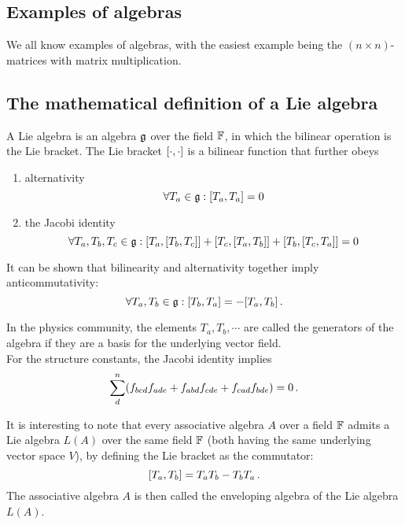    \subsection{Examples of algebras}
        We all know examples of algebras, with the easiest example being the $(n \times n)$-matrices with matrix multiplication. \\

    \subsection{The mathematical definition of a Lie algebra}
        A Lie algebra is an algebra $\operatorname{\mathfrak{g}}$ over the field $\mathbb{F}$, in which the bilinear operation is the Lie bracket. The Lie bracket $\comm{\cdot}{\cdot}$ is a bilinear function that further obeys
        \begin{enumerate}
            \item alternativity
            \begin{equation}
                \forall T_a \in \glie: \comm{T_a}{T_a} = 0
            \end{equation}

            \item the Jacobi identity
            \begin{equation}
                \forall T_a, T_b, T_c \in \glie: \comm{T_a}{\comm{T_b}{T_c}} + \comm{T_c}{\comm{T_a}{T_b}} + \comm{T_b}{\comm{T_c}{T_a}} = 0
            \end{equation}
        \end{enumerate}

        It can be shown that bilinearity and alternativity together imply anticommutativity:
        \begin{equation}
            \forall T_a, T_b \in \glie: \comm{T_b}{T_a} = - \comm{T_a}{T_b} \thinspace .
        \end{equation}

        In the physics community, the elements $T_a, T_b, \cdots$ are called the generators of the algebra if they are a basis for the underlying vector field. \\

        For the structure constants, the Jacobi identity implies
        \begin{equation}
            \sum_d^n (f_{bcd} f_{ade} + f_{abd} f_{cde} + f_{cad} f_{bde}) = 0 \thinspace .
        \end{equation}

        It is interesting to note that every associative algebra $A$ over a field $\mathbb{F}$ admits a Lie algebra $L(A)$ over the same field $\mathbb{F}$ (both having the same underlying vector space $V$), by defining the Lie bracket as the commutator:
        \begin{equation}
            \comm{T_a}{T_b} = T_a T_b - T_b T_a \thinspace .
        \end{equation}
        The associative algebra $A$ is then called the enveloping algebra of the Lie algebra $L(A)$.

